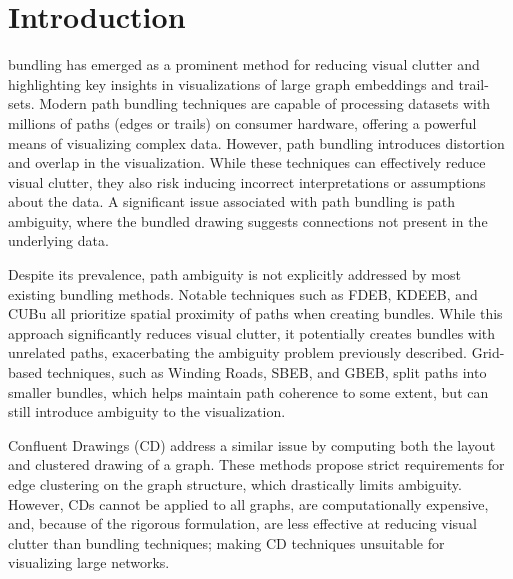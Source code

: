 
\section{Introduction}
\label{sec:intro}

 bundling has emerged as a prominent method for reducing visual clutter and highlighting key insights in visualizations of large graph embeddings and trail-sets. Modern path bundling techniques are capable of processing datasets with millions of paths (edges or trails) on consumer hardware, offering a powerful means of visualizing complex data\cite{lhuillier:2017:survey}. However, path bundling introduces distortion and overlap in the visualization. While these techniques can effectively reduce visual clutter, they also risk inducing incorrect interpretations or assumptions about the data. A significant issue associated with path bundling is path ambiguity, where the bundled drawing suggests connections not present in the underlying data.

Despite its prevalence, path ambiguity is not explicitly addressed by most existing bundling methods. Notable techniques such as FDEB\cite{holten:2009}, KDEEB\cite{hurter:2012}, and CUBu\cite{van:2016} all prioritize spatial proximity of paths when creating bundles. While this approach significantly reduces visual clutter, it potentially creates bundles with unrelated paths, exacerbating the ambiguity problem previously described. Grid-based techniques, such as Winding Roads\cite{lambert:2010}, SBEB\cite{ersoy:2011}, and GBEB\cite{cui:2008}, split paths into smaller bundles, which helps maintain path coherence to some extent, but can still introduce ambiguity to the visualization.

Confluent Drawings (CD)\cite{dickerson:2002} address a similar issue by computing both the layout and clustered drawing of a graph. These methods propose strict requirements for edge clustering on the graph structure, which drastically limits ambiguity. However, CDs cannot be applied to all graphs, are computationally expensive, and, because of the rigorous formulation, are less effective at reducing visual clutter than bundling techniques; making CD techniques unsuitable for visualizing large networks.


